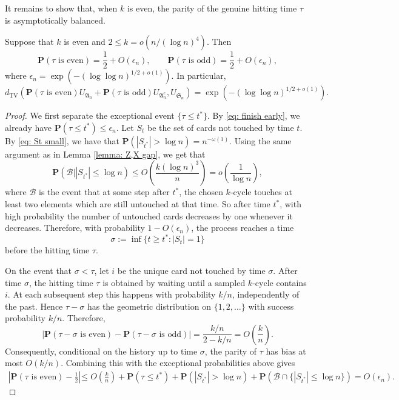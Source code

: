 It remains to show that, when $k$ is even, the parity of the genuine hitting time $\tau$ is asymptotically balanced.

\begin{lemma}\label{lem:parity of the hitting time}
Suppose that \(k\) is even and \(2\leq k=o(n/(\log n)^4)\). Then 
$$ 
\mathbf P(\tau \text{ is even})=\frac12+O\left(\epsilon_n\right),
\qquad
\mathbf P(\tau \text{ is odd})=\frac12+O\left(\epsilon_n\right),
$$
where $\epsilon_n = \exp\left(-(\log \log n)^{1/2+o(1)}\right).$
In particular,
$$
d_{\mathrm{TV}}\left(
\mathbf P(\tau \text{ is even})U_{\mathfrak A_n}+\mathbf P(\tau \text{ is odd})U_{\mathfrak A_n^c},
U_{\mathfrak S_n}\right)=\exp\left(-(\log \log n)^{1/2+o(1)}\right).
$$
\end{lemma}

\begin{proof}
We first separate the exceptional event $\{\tau \leq t^*\}$. By \eqref{eq: finish early}, we already have $\mathbf{P}(\tau \leq t^*) \leq \epsilon_n.$ Let \(S_t\) be the set of cards not touched by time \(t\). By \eqref{eq: St small}, we  have that $\mathbf P(|S_{t^*}|>\log n)=n^{-\omega(1)}$.
Using the same argument as in Lemma \ref{lemma: Z,X gap}, we get that $$\mathbf{P}\left(
\mathcal B \bigg| |S_{t^*}|\leq \log n
\right)
\leq
O\left(\frac{k(\log n)^3}{n}\right)
=
o\left(\frac1{\log n}\right),$$
where $\mathcal B$ is the event that  at some step after $t^*$, the chosen $k$-cycle touches at least two elements which are still untouched at that time. So after time \(t^*\), with high probability the number of untouched cards decreases by one whenever it decreases. 
Therefore, with probability \(1-O(\epsilon_n)\), the process reaches a time
$$
\sigma:=\inf\{t\geq t^*: |S_t|=1\}
$$
before the hitting time \(\tau\).

On the event that \(\sigma<\tau\), let \(i\) be the unique card not touched by time \(\sigma\). After time \(\sigma\), the hitting time \(\tau\) is obtained by waiting until a sampled \(k\)-cycle contains \(i\). At each subsequent step this happens with probability \(k/n\), independently of the past. Hence
$\tau-\sigma$ has the geometric distribution on \(\{1,2,\ldots\}\) with success probability \(k/n\). Therefore,
$$
\left|\mathbf P(\tau-\sigma\text{ is even})-\mathbf P(\tau-\sigma\text{ is odd})\right|
=
\frac{k/n}{2-k/n}
=
O\left(\frac{k}{n}\right).
$$
Consequently, conditional on the history up to time \(\sigma\), the parity of \(\tau\) has bias at most \(O(k/n)\). Combining this with the exceptional probabilities above gives
\begin{equation}
    \begin{aligned}
        \left|
\mathbf P(\tau \text{ is even})-\frac12
\right|
&\leq
O\left(\frac{k}{n}\right)
+
\mathbf P(\tau\leq t^*)
+
\mathbf P(|S_{t^*}|>\log n)
+
\mathbf P\left(
\mathcal B\cap\{|S_{t^*}|\leq\log n\}
\right)=
O\left(\epsilon_n\right).
    \end{aligned}
\end{equation}


\end{proof}

